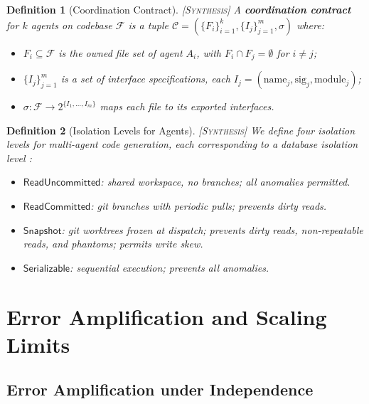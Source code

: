 \documentclass[11pt, a4paper, copyright]{googledeepmind}
\newtheorem{definition}{Definition}[section]
\newcommand{\synthesis}{\textsc{[Synthesis]}}
\begin{document}
\begin{definition}[Coordination Contract] \synthesis{}
\label{def:contract}
A \textbf{coordination contract} for $k$ agents on codebase $\mathcal{F}$ is a tuple $\mathcal{C} = (\{F_i\}_{i=1}^k, \{I_j\}_{j=1}^m, \sigma)$ where:
\begin{itemize}[nosep]
  \item $F_i \subseteq \mathcal{F}$ is the owned file set of agent $A_i$, with $F_i \cap F_j = \emptyset$ for $i \neq j$;
  \item $\{I_j\}_{j=1}^m$ is a set of interface specifications, each $I_j = (\mathrm{name}_j, \mathrm{sig}_j, \mathrm{module}_j)$;
  \item $\sigma: \mathcal{F} \to 2^{\{I_1,\ldots,I_m\}}$ maps each file to its exported interfaces.
\end{itemize}
\end{definition}

\begin{definition}[Isolation Levels for Agents] \synthesis{}
\label{def:isolation}
We define four isolation levels for multi-agent code generation, each corresponding to a database isolation level \citep{Berenson1995}:
\begin{itemize}[nosep]
  \item $\mathsf{ReadUncommitted}$: shared workspace, no branches; all anomalies permitted.
  \item $\mathsf{ReadCommitted}$: git branches with periodic pulls; prevents dirty reads.
  \item $\mathsf{Snapshot}$: git worktrees frozen at dispatch; prevents dirty reads, non-repeatable reads, and phantoms; permits write skew.
  \item $\mathsf{Serializable}$: sequential execution; prevents all anomalies.
\end{itemize}
\end{definition}


\section{Error Amplification and Scaling Limits}
\label{sec:error}

\subsection{Error Amplification under Independence}
\end{document}
